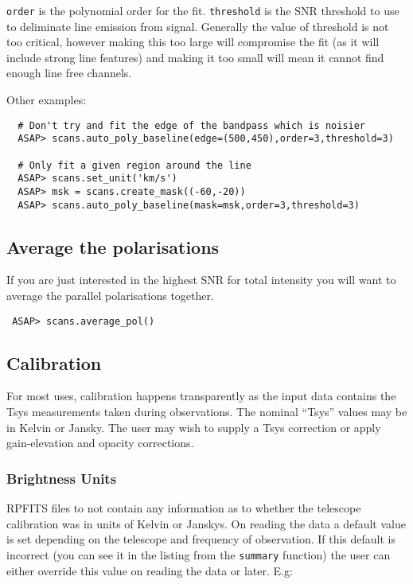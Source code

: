 \documentclass[11pt]{article}
\newcommand{\cmd}[1]{{\tt #1}}
\begin{document}
\cmd{order} is the polynomial order for the fit. \cmd{threshold} is
the SNR threshold to use to deliminate line emission from
signal. Generally the value of threshold is not too critical, however
making this too large will compromise the fit (as it will include
strong line features) and making it too small will mean it cannot find
enough line free channels.


Other examples:

\begin{verbatim}
  # Don't try and fit the edge of the bandpass which is noisier
  ASAP> scans.auto_poly_baseline(edge=(500,450),order=3,threshold=3)

  # Only fit a given region around the line
  ASAP> scans.set_unit('km/s')
  ASAP> msk = scans.create_mask((-60,-20))
  ASAP> scans.auto_poly_baseline(mask=msk,order=3,threshold=3)

\end{verbatim}

\subsection{Average the polarisations}

If you are just interested in the highest SNR for total intensity you
will want to average the parallel polarisations together.

\begin{verbatim}
 ASAP> scans.average_pol()
\end{verbatim}

\subsection{Calibration}

For most uses, calibration happens transparently as the input data
contains the Tsys measurements taken during observations. The nominal
``Tsys'' values may be in Kelvin or Jansky. The user may wish to
supply a Tsys correction or apply gain-elevation and opacity
corrections.

\subsubsection{Brightness Units}

RPFITS files to not contain any information as to whether the telescope
calibration was in units of Kelvin or Janskys.  On reading the data a
default value is set depending on the telescope and frequency of
observation.  If this default is incorrect (you can see it in the
listing from the \cmd{summary} function) the user can either override
this value on reading the data or later.  E.g:
\end{document}
